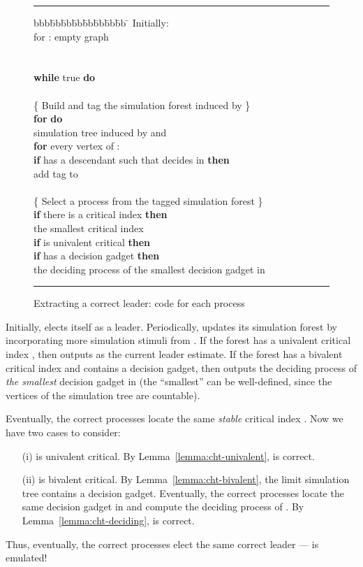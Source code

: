 \documentclass[11pt]{article}
\newcounter{linenumber}
\begin{document}
\begin{figure}[htbp]
\hrule \vspace{2mm} {\small
\setcounter{linenumber}{0}
\begin{tabbing}
 bbb\=bb\=bb\=bb\=bb\=bb\=bb\=bb \=  \kill
\>Initially:\\
\>\> for :  empty graph\\
\>\> \\
\\
\> \textbf{while} true \textbf{do}\\
\\
\>\>\{ Build and tag the simulation forest induced by  \}\\
\>\>	\textbf{for} 	\textbf{do} \\
\>\>\> 		 simulation tree induced by  and \\
\>\>\>		\textbf{for} every vertex  of :\\
\>\>\>\> 			\textbf{if}  has a descendant  such that  decides 
				in  \textbf{then} \\
\>\>\>\>\>			add tag  to \\
\\
\>\>\{ Select a process from the tagged simulation forest \}\\
\>\>	\textbf{if} there is a critical index \textbf{then}\\
\>\>\> 		 the smallest critical index\\
\>\>\>		\textbf{if}  is univalent critical \textbf{then}  \\
\>\>\> 		\textbf{if}  has a decision gadget \textbf{then}\\
\>\>\>\>			 the deciding process of the smallest
				decision gadget in  
\end{tabbing}
\hrule }
\caption{Extracting a correct leader: code for each process }
\label{fig:CHT-comp}
\end{figure}

Initially,  elects itself as a leader.
Periodically,  updates its simulation forest  by incorporating more
	simulation stimuli from .
If the forest has a univalent critical index , then  outputs  as
	the current leader estimate.
If the forest has a bivalent critical index  and  contains
	a decision gadget, then  outputs the deciding process of \emph{the smallest} decision
	gadget in  (the ``smallest'' can be well-defined,
	since the vertices of the simulation tree are countable).

Eventually, the correct processes locate the same \emph{stable} critical index .
Now we have two cases to consider:

\begin{enumerate}
\item[(i)]  is univalent critical.
	By Lemma~\ref{lemma:cht-univalent},  is correct.
\item[(ii)]  is bivalent critical.
	By Lemma~\ref{lemma:cht-bivalent}, the limit simulation tree 
		 contains a decision gadget.
	Eventually, the correct processes locate the same decision gadget
		 in  and compute the deciding process 
		of .
	By Lemma~\ref{lemma:cht-deciding},  is correct.
\end{enumerate}

Thus, eventually, the correct processes elect the same correct leader
	---  is emulated!
\end{document}
